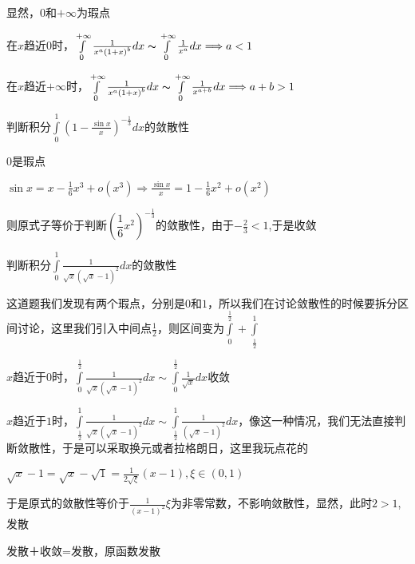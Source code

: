\documentclass[lang=cn,10pt]{elegantbook}
\begin{document}
\begin{solution}
	
	显然，$0$和$+\infty$为瑕点
	
	在$x$趋近$0$时，$\int\limits_0^{+\infty}{\frac{1}{x^a\left( 1+x \right) ^b}dx}\thicksim \int\limits_0^{+\infty}{\frac{1}{x^a}dx}\Longrightarrow a<1
	$
	
	在$x$趋近$+\infty$时，$\int\limits_0^{+\infty}{\frac{1}{x^a\left( 1+x \right) ^b}dx}\thicksim \int\limits_0^{+\infty}{\frac{1}{x^{a+b}}dx}\Longrightarrow a+b>1$
\end{solution}
\begin{example}
	判断积分$\int\limits_0^1{\left( 1-\frac{\sin x}{x} \right) ^{-\frac{1}{3}}dx}$的敛散性
\end{example}
\begin{solution}
	
	$0$是瑕点
	
	$\sin x=x-\frac{1}{6}x^3+o\left( x^3 \right) \Longrightarrow \frac{\sin x}{x}=1-\frac{1}{6}x^2+o\left( x^2 \right)$
	
	则原式子等价于判断$(\dfrac{1}{6}x^{2})^{-\frac{1}{3}}$的敛散性，由于$-\frac{2}{3}<1$,于是收敛
	\end{solution}
\begin{example}
	判断积分$\int\limits_0^1{\frac{1}{\sqrt{x}\left( \sqrt{x}-1 \right) ^2}dx}$的敛散性
\end{example}
\begin{solution}
	
	这道题我们发现有两个瑕点，分别是$0$和$1$，所以我们在讨论敛散性的时候要拆分区间讨论，这里我们引入中间点$\frac{1}{2}$，则区间变为$\int\limits_0^{\frac{1}{2}}{}+\int\limits_{\frac{1}{2}}^1{}$
	
	$x$趋近于$0$时，$\int\limits_0^{\frac{1}{2}}{\frac{1}{\sqrt{x}\left( \sqrt{x}-1 \right) ^2}dx}\sim \int\limits_0^{\frac{1}{2}}{\frac{1}{\sqrt{x}}dx}$收敛
	
	$x$趋近于$1$时，$\int\limits_{\frac{1}{2}}^1{\frac{1}{\sqrt{x}\left( \sqrt{x}-1 \right) ^2}dx}\sim \int\limits_{\frac{1}{2}}^1{\frac{1}{\left( \sqrt{x}-1 \right) ^2}dx}$，像这一种情况，我们无法直接判断敛散性，于是可以采取换元或者拉格朗日，这里我玩点花的
	
	$\sqrt{x}-1=\sqrt{x}-\sqrt{1}=\frac{1}{2\sqrt{\xi}}\left( x-1 \right) ,\xi \in \left( 0,1 \right) $
	
	于是原式的敛散性等价于$\frac{1}{(x-1)^{2}}$$\xi$为非零常数，不影响敛散性，显然，此时$2>1$,发散
	
	发散＋收敛=发散，原函数发散
\end{solution}
\end{document}

